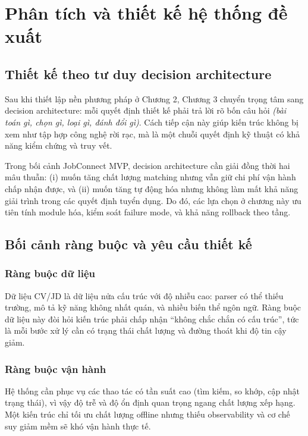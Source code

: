 \chapter{Phân tích và thiết kế hệ thống đề xuất}

\section{Thiết kế theo tư duy decision architecture}

Sau khi thiết lập nền phương pháp ở Chương 2, Chương 3 chuyển trọng tâm sang decision architecture: mỗi quyết định thiết kế phải trả lời rõ bốn câu hỏi \textit{(bài toán gì, chọn gì, loại gì, đánh đổi gì)}. Cách tiếp cận này giúp kiến trúc không bị xem như tập hợp công nghệ rời rạc, mà là một chuỗi quyết định kỹ thuật có khả năng kiểm chứng và truy vết.

Trong bối cảnh JobConnect MVP, decision architecture cần giải đồng thời hai mâu thuẫn: (i) muốn tăng chất lượng matching nhưng vẫn giữ chi phí vận hành chấp nhận được, và (ii) muốn tăng tự động hóa nhưng không làm mất khả năng giải trình trong các quyết định tuyển dụng. Do đó, các lựa chọn ở chương này ưu tiên tính module hóa, kiểm soát failure mode, và khả năng rollback theo tầng.

\section{Bối cảnh ràng buộc và yêu cầu thiết kế}

\subsection{Ràng buộc dữ liệu}

Dữ liệu CV/JD là dữ liệu nửa cấu trúc với độ nhiễu cao: parser có thể thiếu trường, mô tả kỹ năng không nhất quán, và nhiều biến thể ngôn ngữ. Ràng buộc dữ liệu này đòi hỏi kiến trúc phải chấp nhận ``không chắc chắn có cấu trúc'', tức là mỗi bước xử lý cần có trạng thái chất lượng và đường thoát khi độ tin cậy giảm.

\subsection{Ràng buộc vận hành}

Hệ thống cần phục vụ các thao tác có tần suất cao (tìm kiếm, so khớp, cập nhật trạng thái), vì vậy độ trễ và độ ổn định quan trọng ngang chất lượng xếp hạng. Một kiến trúc chỉ tối ưu chất lượng offline nhưng thiếu observability và cơ chế suy giảm mềm sẽ khó vận hành thực tế.


